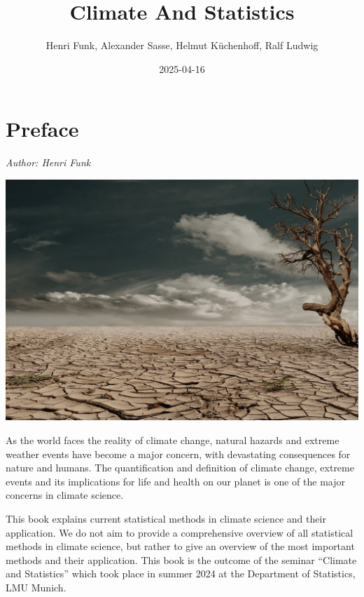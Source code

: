 \documentclass[
]{krantz}
\title{Climate And Statistics}
\author{Henri Funk, Alexander Sasse, Helmut Küchenhoff, Ralf Ludwig}
\date{2025-04-16}
\begin{document}
\maketitle


\thispagestyle{empty}

\begin{center}
\end{center}

\setlength{\abovedisplayskip}{-5pt}
\setlength{\abovedisplayshortskip}{-5pt}

{
\hypersetup{linkcolor=}
\setcounter{tocdepth}{0}
\tableofcontents
}
\chapter*{Preface}\label{preface}


\emph{Author: Henri Funk}

\begin{center}\includegraphics[width=0.75\linewidth]{cover} \end{center}

As the world faces the reality of climate change, natural hazards and extreme weather events have become a major concern, with devastating consequences for nature and humans. The quantification and definition of climate change, extreme events and its implications for life and health on our planet is one of the major concerns in climate science.

This book explains current statistical methods in climate science and their application.
We do not aim to provide a comprehensive overview of all statistical methods in climate science, but rather to give an overview of the most important methods and their application.
This book is the outcome of the seminar ``Climate and Statistics'' which took place in summer 2024 at the Department of Statistics, LMU Munich.
\end{document}
